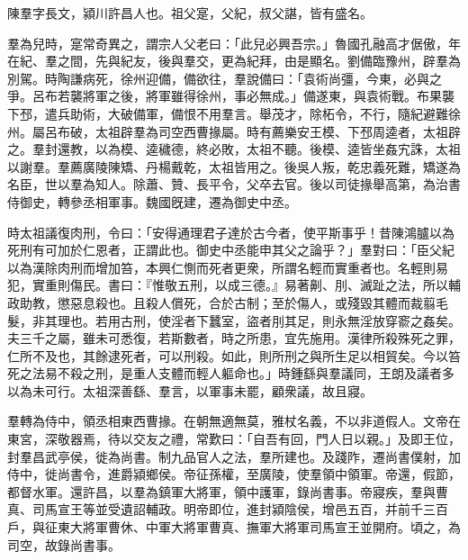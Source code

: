 \begin{pinyinscope}
 
 
 陳羣字長文，潁川許昌人也。祖父寔，父紀，叔父諶，皆有盛名。
 
 
 羣為兒時，寔常奇異之，謂宗人父老曰：「此兒必興吾宗。」魯國孔融高才倨傲，年在紀、羣之間，先與紀友，後與羣交，更為紀拜，由是顯名。劉備臨豫州，辟羣為別駕。時陶謙病死，徐州迎備，備欲往，羣說備曰：「袁術尚彊，今東，必與之爭。呂布若襲將軍之後，將軍雖得徐州，事必無成。」備遂東，與袁術戰。布果襲下邳，遣兵助術，大破備軍，備恨不用羣言。舉茂才，除柘令，不行，隨紀避難徐州。屬呂布破，太祖辟羣為司空西曹掾屬。時有薦樂安王模、下邳周逵者，太祖辟之。羣封還教，以為模、逵穢德，終必敗，太祖不聽。後模、逵皆坐姦宄誅，太祖以謝羣。羣薦廣陵陳矯、丹楊戴乾，太祖皆用之。後吳人叛，乾忠義死難，矯遂為名臣，世以羣為知人。除蕭、贊、長平令，父卒去官。後以司徒掾舉高第，為治書侍御史，轉參丞相軍事。魏國旣建，遷為御史中丞。
 
 
 
 
 時太祖議復肉刑，令曰：「安得通理君子達於古今者，使平斯事乎！昔陳鴻臚以為死刑有可加於仁恩者，正謂此也。御史中丞能申其父之論乎？」羣對曰：「臣父紀以為漢除肉刑而增加笞，本興仁惻而死者更衆，所謂名輕而實重者也。名輕則易犯，實重則傷民。書曰：『惟敬五刑，以成三德。』易著劓、刖、滅趾之法，所以輔政助教，懲惡息殺也。且殺人償死，合於古制；至於傷人，或殘毀其體而裁翦毛髮，非其理也。若用古刑，使淫者下蠶室，盜者刖其足，則永無淫放穿窬之姦矣。夫三千之屬，雖未可悉復，若斯數者，時之所患，宜先施用。漢律所殺殊死之罪，仁所不及也，其餘逮死者，可以刑殺。如此，則所刑之與所生足以相貿矣。今以笞死之法易不殺之刑，是重人支體而輕人軀命也。」時鍾繇與羣議同，王朗及議者多以為未可行。太祖深善繇、羣言，以軍事未罷，顧衆議，故且寢。
 
 
 
 
 羣轉為侍中，領丞相東西曹掾。在朝無適無莫，雅杖名義，不以非道假人。文帝在東宮，深敬器焉，待以交友之禮，常歎曰：「自吾有回，門人日以親。」及即王位，封羣昌武亭侯，徙為尚書。制九品官人之法，羣所建也。及踐阼，遷尚書僕射，加侍中，徙尚書令，進爵潁鄉侯。帝征孫權，至廣陵，使羣領中領軍。帝還，假節，都督水軍。還許昌，以羣為鎮軍大將軍，領中護軍，錄尚書事。帝寢疾，羣與曹真、司馬宣王等並受遺詔輔政。明帝即位，進封潁陰侯，增邑五百，并前千三百戶，與征東大將軍曹休、中軍大將軍曹真、撫軍大將軍司馬宣王並開府。頃之，為司空，故錄尚書事。
 

\end{pinyinscope}
